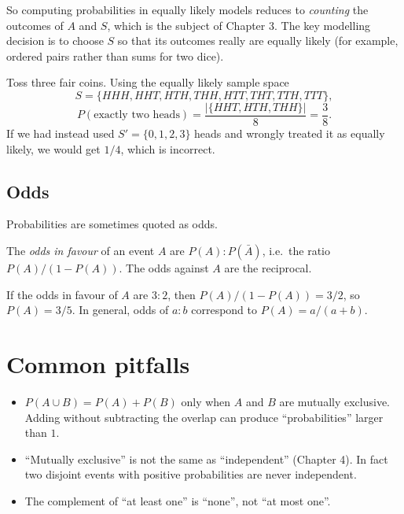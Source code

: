 So computing probabilities in equally likely models reduces to \emph{counting} the
outcomes of $A$ and $S$, which is the subject of Chapter 3. The key modelling decision is
to choose $S$ so that its outcomes really are equally likely (for example, ordered pairs
rather than sums for two dice).

\begin{example}
Toss three fair coins. Using the equally likely sample space
\[
  S = \{HHH,HHT,HTH,THH,HTT,THT,TTH,TTT\},
\]
\[
  P(\text{exactly two heads}) = \frac{|\{HHT,HTH,THH\}|}{8} = \frac38.
\]
If we had instead used $S' = \{0,1,2,3\}$ heads and wrongly treated it as equally likely,
we would get $1/4$, which is incorrect.
\end{example}

\subsection{Odds}

Probabilities are sometimes quoted as odds.

\begin{definition}[Odds]
The \emph{odds in favour} of an event $A$ are $P(A) : P(\bar A)$, i.e.\ the ratio
$P(A)/(1-P(A))$. The odds against $A$ are the reciprocal.
\end{definition}

\begin{example}
If the odds in favour of $A$ are $3:2$, then $P(A)/(1-P(A)) = 3/2$, so $P(A) = 3/5$. In
general, odds of $a : b$ correspond to $P(A) = a/(a+b)$.
\end{example}

\section{Common pitfalls}

\begin{itemize}
  \item $P(A\cup B) = P(A) + P(B)$ only when $A$ and $B$ are mutually exclusive. Adding
        without subtracting the overlap can produce ``probabilities'' larger than $1$.
  \item ``Mutually exclusive'' is not the same as ``independent'' (Chapter 4). In fact two
        disjoint events with positive probabilities are never independent.
  \item The complement of ``at least one'' is ``none'', not ``at most one''.
\end{itemize}

